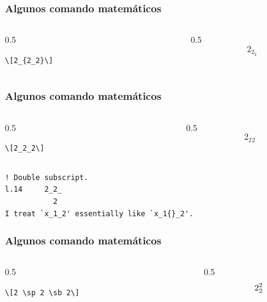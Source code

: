 \documentclass[12pt,aspectratio=169,ignorenonframetext]{ltxbeamer}
\begin{document}
\begin{frame}[fragile]
\frametitle{Algunos comando matemáticos}

\begin{columns}
    \begin{column}{0.5\textwidth}
        \begin{verbatim}
\[2_{2_2}\]
        \end{verbatim}
    \end{column}
    {\color{gray} \vline}
    \begin{column}{0.5\textwidth}
        \[2_{2_2}\]
    \end{column}
\end{columns}
\end{frame}





\begin{frame}[fragile]
\frametitle{Algunos comando matemáticos}

\begin{columns}
    \begin{column}{0.5\textwidth}
        \begin{verbatim}
\[2_2_2\]
        \end{verbatim}
    \end{column}
    {\color{gray} \vline}
    \begin{column}{0.5\textwidth}
        \[2_2{}_2\]
    \end{column}
\end{columns}

\pause

\begin{verbatim}
! Double subscript.
l.14     2_2_
           2
I treat `x_1_2' essentially like `x_1{}_2'.
\end{verbatim}
\end{frame}





\begin{frame}[fragile]
\frametitle{Algunos comando matemáticos}

\begin{columns}
    \begin{column}{0.5\textwidth}
        \begin{verbatim}
\[2 \sp 2 \sb 2\]
        \end{verbatim}
    \end{column}
    {\color{gray} \vline}
    \begin{column}{0.5\textwidth}
        \[2 \sp 2 \sb 2\]
    \end{column}
\end{columns}
\end{frame}
\end{document}
